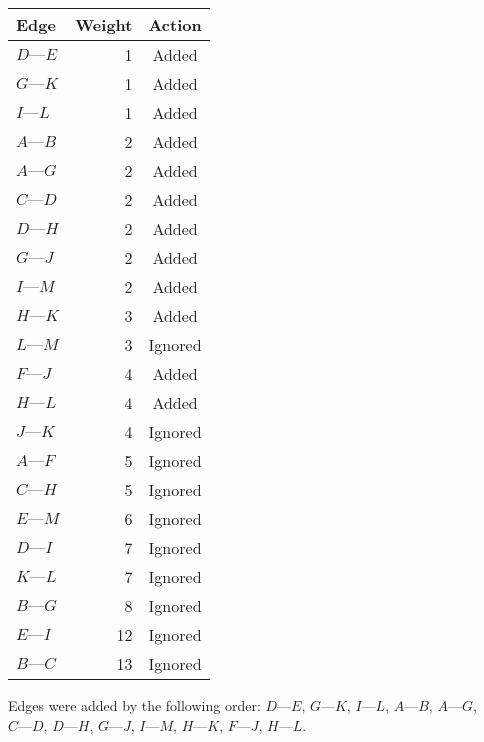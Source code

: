 {\begin{center} \begin{tabular}{l | r c}
    \textbf{Edge}    & \textbf{Weight} & \textbf{Action} \\ \hline
    $D \text{---} E$ &               1 & Added \\
    $G \text{---} K$ &               1 & Added \\
    $I \text{---} L$ &               1 & Added \\
    $A \text{---} B$ &               2 & Added \\
    $A \text{---} G$ &               2 & Added \\
    $C \text{---} D$ &               2 & Added \\
    $D \text{---} H$ &               2 & Added \\
    $G \text{---} J$ &               2 & Added \\
    $I \text{---} M$ &               2 & Added \\
    $H \text{---} K$ &               3 & Added \\
    $L \text{---} M$ &               3 & Ignored \\
    $F \text{---} J$ &               4 & Added \\
    $H \text{---} L$ &               4 & Added \\
    $J \text{---} K$ &               4 & Ignored \\
    $A \text{---} F$ &               5 & Ignored \\
    $C \text{---} H$ &               5 & Ignored \\
    $E \text{---} M$ &               6 & Ignored \\
    $D \text{---} I$ &               7 & Ignored \\
    $K \text{---} L$ &               7 & Ignored \\
    $B \text{---} G$ &               8 & Ignored \\
    $E \text{---} I$ &              12 & Ignored \\
    $B \text{---} C$ &              13 & Ignored
\end{tabular} \end{center}

Edges were added by the following order: $D \text{---} E$, $G \text{---} K$, $I \text{---} L$, $A \text{---} B$, $A \text{---} G$, $C \text{---} D$, $D \text{---} H$, $G \text{---} J$, $I \text{---} M$, $H \text{---} K$, $F \text{---} J$, $H \text{---} L$.

}
